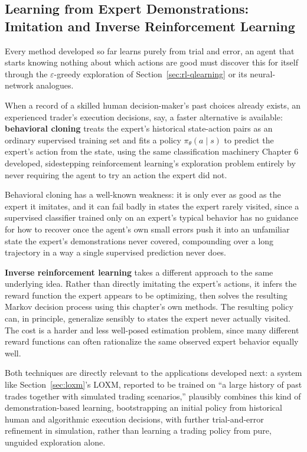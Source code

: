 \documentclass[../ai_in_finance]{subfiles}
\begin{document}
\subsection{Learning from Expert Demonstrations: Imitation and Inverse Reinforcement Learning}
\label{sec:imitation}

Every method developed so far learns purely from trial and error, an agent that starts knowing nothing about which actions are good must discover this for itself through the $\varepsilon$-greedy exploration of Section~\ref{sec:rl-qlearning} or its neural-network analogues.

When a record of a skilled human decision-maker's past choices already exists, an experienced trader's execution decisions, say, a faster alternative is available: \textbf{behavioral cloning} treats the expert's historical state-action pairs as an ordinary supervised training set and fits a policy $\pi_\theta(a\mid s)$ to predict the expert's action from the state, using the same classification machinery Chapter 6 developed, sidestepping reinforcement learning's exploration problem entirely by never requiring the agent to try an action the expert did not.

Behavioral cloning has a well-known weakness: it is only ever as good as the expert it imitates, and it can fail badly in states the expert rarely visited, since a supervised classifier trained only on an expert's typical behavior has no guidance for how to recover once the agent's own small errors push it into an unfamiliar state the expert's demonstrations never covered, compounding over a long trajectory in a way a single supervised prediction never does.

\textbf{Inverse reinforcement learning} takes a different approach to the same underlying idea. Rather than directly imitating the expert's actions, it infers the reward function the expert appears to be optimizing, then solves the resulting Markov decision process using this chapter's own methods. The resulting policy can, in principle, generalize sensibly to states the expert never actually visited. The cost is a harder and less well-posed estimation problem, since many different reward functions can often rationalize the same observed expert behavior equally well.

Both techniques are directly relevant to the applications developed next: a system like Section~\ref{sec:loxm}'s LOXM, reported to be trained on ``a large history of past trades together with simulated trading scenarios,'' plausibly combines this kind of demonstration-based learning, bootstrapping an initial policy from historical human and algorithmic execution decisions, with further trial-and-error refinement in simulation, rather than learning a trading policy from pure, unguided exploration alone.
\end{document}
